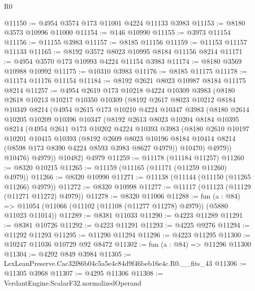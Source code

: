 \begin{lexlean}{R0}
\begin{coremodule}
@11150 := @4954 @3574 @173 @11001 @4224 @11133 @3983
@11153 := @8180 @3573 @10996 @11000
@11154 := @146 @10990
@11155 := @3973 @11154
@11156 := @11155 @3983
@11157 := @8185 @11156
@11159 := @11153 @11157 @11133
@11165 := @8192 @3572 @8023 @10995 @8184 @11156 @8214
@11171 := @4954 @3570 @173 @10993 @4224 @11154 @3983
@11174 := @8180 @3569 @10988 @10992
@11175 := @10310 @3983
@11176 := @8185 @11175
@11178 := @11174 @11176 @11154
@11184 := @8192 @2621 @8023 @10987 @8184 @11175 @8214
@11257 := @4954
    @2619
    @173
    @10218
    @4224
    @10309
    @3983
    (@8180
      @2618
      @10213
      @10217
      @10350
      @10309
      (@8192
        @2617
        @8023
        @10212
        @8184
        @10349
        @8214
        (@4954
          @2615
          @173
          @10210
          @4224
          @10347
          @3983
          (@8180
            @2614
            @10205
            @10209
            @10396
            @10347
            (@8192
              @2613
              @8023
              @10204
              @8184
              @10395
              @8214
              (@4954
                @2611
                @173
                @10202
                @4224
                @10393
                @3983
                (@8180
                  @2610
                  @10197
                  @10201
                  @10415
                  @10393
                  (@8192
                    @2609
                    @8023
                    @10196
                    @8184
                    @10414
                    @8214
                    (@8598 @173 @8390 @4224 @8593 @3983 @8627 @4979))
                  @10470)
                @4979))
            @10476)
          @4979))
      @10482)
    @4979
@11259 := @11178 (@11184 @11257)
@11260 := @8320 @10215
@11265 := @11159 (@11165 (@11171 (@11259 @11260) @4979))
@11266 := @8320 @10990
@11271 := @11138 (@11144 (@11150 (@11265 @11266) @4979))
@11272 := @8320 @10998
@11277 := @11117 (@11123 (@11129 (@11271 @11272) @4979))
@11278 := @8320 @11006
@11288 := fun (a : @84) =>
  @11054 (@11066 (@11102 (@11108 (@11277 @11278) @4979)) (@5880 @11023 @11014))
@11289 := @8381 @11033
@11290 := @4223 @11289
@11291 := @8381 @10726
@11292 := @4223 @11291
@11293 := @4225 @9276
@11294 := @11292 @11293
@11295 := @11290 @11294
@11296 := @4223 @11295
@11300 := @10247 @11036 @10729 @92 @8472
@11302 := fun (a : @84) => @11296 @11300
@11304 := @4292 @849 @3984
@11305 := LexLeanPreserve.Cac32f86b04c5a5e4c84d9f46beb16e4c.R0.__fits_43
@11306 := @11305 @3968
@11307 := @4295 @11306
@11308 := VerdantEngine.ScalarF32.normalizedOperand

\end{coremodule}
\end{lexlean}
